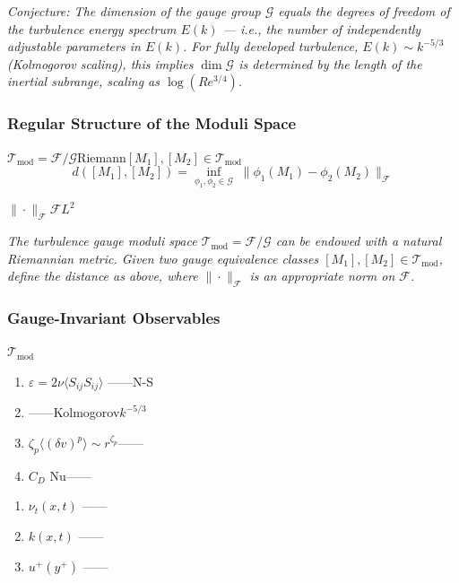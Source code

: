 \documentclass[12pt,a4paper]{article}
\theoremstyle{remark}
\newcommand{\G}{\mathcal{G}}
\newcommand{\T}{\mathcal{T}}
\newcommand{\F}{\mathcal{F}}
\begin{document}
\medskip
\noindent\textit{Conjecture: The dimension of the gauge group $\G$ equals the degrees of freedom of the turbulence energy spectrum $E(k)$ — i.e., the number of independently adjustable parameters in $E(k)$. For fully developed turbulence, $E(k) \sim k^{-5/3}$ (Kolmogorov scaling), this implies $\dim \G$ is determined by the length of the inertial subrange, scaling as $\log(Re^{3/4})$.}

\subsubsection{ Regular Structure of the Moduli Space}

$\T_{\text{mod}} = \F/\G$Riemann$[M_1], [M_2] \in \T_{\text{mod}}$
\begin{equation}
    d([M_1], [M_2]) = \inf_{\phi_1, \phi_2 \in \G} \; \| \phi_1(M_1) - \phi_2(M_2) \|_{\F}
\end{equation}

$\|\cdot\|_\F$$\F$$L^2$

\medskip
\noindent\textit{The turbulence gauge moduli space $\T_{\text{mod}} = \F/\G$ can be endowed with a natural Riemannian metric. Given two gauge equivalence classes $[M_1], [M_2] \in \T_{\text{mod}}$, define the distance as above, where $\|\cdot\|_\F$ is an appropriate norm on $\F$.}

\subsubsection{ Gauge-Invariant Observables}

$\T_{\text{mod}}$\textbf{}
\begin{enumerate}[label=(\roman*)]
    \item \textbf{} $\varepsilon = 2\nu \langle S_{ij} S_{ij} \rangle$ ——N-S
    \item \textbf{} ——Kolmogorov$k^{-5/3}$
    \item \textbf{} $\zeta_p$$\langle (\delta v)^p \rangle \sim r^{\zeta_p}$——
    \item \textbf{} $C_D$\textbf{} Nu——
\end{enumerate}

\textbf{}
\begin{enumerate}[label=(\roman*)]
    \item \textbf{} $\nu_t(x, t)$ ——
    \item \textbf{} $k(x, t)$ ——
    \item \textbf{} $u^+(y^+)$ ——
\end{enumerate}
\end{document}
